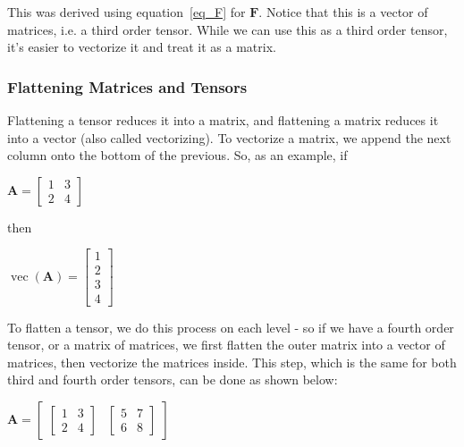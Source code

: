 \documentclass[twocolumn,10pt]{asme2ej}
\DeclareMathOperator{\vect}{vec}
\begin{document}
This was derived using equation~\ref{eq_F} for $\bm{F}$. Notice that this is a vector of matrices, i.e. a third order tensor. While we can use this as a third order tensor, it's easier to vectorize it and treat it as a matrix.

\subsubsection{Flattening Matrices and Tensors}

Flattening a tensor reduces it into a matrix, and flattening a matrix reduces it into a vector (also called vectorizing). To vectorize a matrix, we append the next column onto the bottom of the previous. So, as an example, if

\bigskip
\begin{center}
$\bm{A} = \begin{bmatrix} 1 & 3 \\ 2 & 4 \end{bmatrix}$
\end{center}

then

\begin{center}
$\vect (\bm{A}) = \begin{bmatrix} 1 \\ 2 \\ 3 \\ 4 \end{bmatrix}$
\end{center}

To flatten a tensor, we do this process on each level - so if we have a fourth order tensor, or a matrix of matrices, we first flatten the outer matrix into a vector of matrices, then vectorize the matrices inside. This step, which is the same for both third and fourth order tensors, can be done as shown below:

\bigskip
\begin{center}
$\bm{A} = \begin{bmatrix} \begin{bmatrix} 1 & 3 \\ 2 & 4 \end{bmatrix} & \begin{bmatrix} 5 & 7 \\ 6 & 8 \end{bmatrix} \end{bmatrix}$
\end{center}
\end{document}
